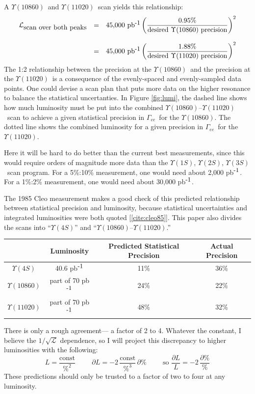 \documentclass[12pt]{article}
\def\yis{$\Upsilon(1S)$}
\def\yiis{$\Upsilon(2S)$}
\def\yiiis{$\Upsilon(3S)$}
\def\yivs{$\Upsilon(4S)$}
\def\yvs{$\Upsilon(10860)$}
\def\yvis{$\Upsilon(11020)$}
\def\gamee{$\Gamma_{ee}$}
\begin{document}
A \yvs\ and \yvis\ scan yields this relationship:
\begin{equation}
  \begin{array}{r c l}
  \displaystyle \mathcal{L}_{\mbox{scan over both peaks}} &=& \displaystyle \mbox{45,000 pb$^{\mbox{\small -1}}$}
    \left(\frac{\mbox{0.95\%}}{\mbox{desired \yvs\ precision}}\right)^2 \\
  & & \\
  &=& \displaystyle \mbox{45,000 pb$^{\mbox{\small -1}}$}
    \left(\frac{\mbox{1.88\%}}{\mbox{desired \yvis\ precision}}\right)^2
  \end{array}
\end{equation}
The 1:2 relationship between the precision at the \yvs\ and the
precision at the \yvis\ is a consequence of the evenly-spaced and
evenly-sampled data points. One could devise a scan plan that puts
more data on the higher resonance to balance the statistical
uncertanties. In Figure \ref{fig:lumi}, the dashed line shows how much
luminosity must be put into the combined \yvs--\yvis\ scan to achieve
a given statistical precision in \gamee\ for the \yvs. The dotted line
shows the combined luminosity for a given precision in \gamee\ for the
\yvis.

Here it will be hard to do better than the current best measurements,
since this would require orders of magnitude more data than the \yis,
\yiis, \yiiis\ scan program. For a 5\%:10\% measurement, one would need
about 2,000 pb$^{\mbox{\small -1}}$. For a 1\%:2\% measurement, one would
need about 30,000 pb$^{\mbox{\small -1}}$.

The 1985 {\sc Cleo} measurement makes a good check of this predicted
relationship between statistical precision and luminosity, because
statistical uncertainties and integrated luminosities were both quoted
[\ref{cite:cleo85}]. This paper also divides the scans into ``\yivs''
and ``\yvs--\yvis.''
\begin{center}
  \begin{tabular}{c | c c c}
    & Luminosity & Predicted Statistical Precision & Actual Precision \\\hline
    \yivs & 40.6 pb$^{\mbox{\small -1}}$ & 11\% & 36\% \\
    \yvs & part of 70 pb$^{\mbox{\small -1}}$ & 24\% & 22\% \\
    \yvis & part of 70 pb$^{\mbox{\small -1}}$ & 48\% & 32\% \\
  \end{tabular}
\end{center}
There is only a rough agreement--- a factor of 2 to 4. Whatever the
constant, I believe the $1/\sqrt{\mathcal{L}}$ dependence, so I will project
this discrepancy to higher luminosities with the following:
\begin{equation}
  L = \frac{\mbox{const}}{\%^2} \hspace{1cm}
  \partial L = -2\,\frac{\mbox{const}}{\%^3}\,\partial \% \hspace{1cm}
  \mbox{so } \frac{\partial L}{L} = -2\,\frac{\partial \%}{\%}
\end{equation}
These predictions should only be trusted to a factor of two to four at
any luminosity.
\end{document}
